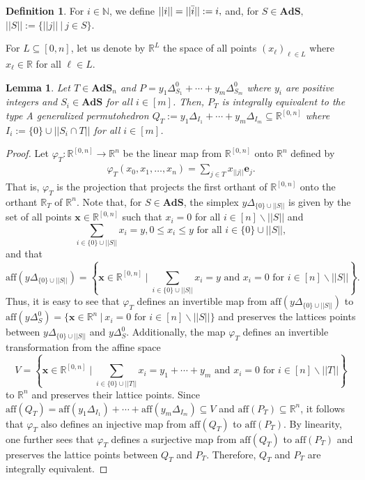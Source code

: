 \documentclass[12pt,reqno]{article}%
\newtheorem{lem}[thm]{Lemma}
\theoremstyle{definition}
\newtheorem{defn}[thm]{Definition}
\numberwithin{equation}{section}
\newcommand{\bbe}{\mathbf{e}}
\newcommand{\bbx}{\mathbf{x}}
\newcommand{\N}{\mathbb N}
\newcommand{\R}{\mathbb R}
\newcommand{\ads}{\mathbf{AdS}}
\begin{document}
\begin{defn} For $i \in \N$, we define $||i||=||\Bar{i}|| := i,$ and, for $S \in \ads,$ $||S||:= \{||j|| \ | \ j \in S\}$.
\end{defn}

For $L \subseteq [0,n]$, let us denote by $\R^{L}$ the space of all points $(x_\ell)_{\ell \in L}$ where $x_\ell \in \R$ for all $\ell \in L.$

\begin{lem}\label{lem: biject-to-type-A}
    Let $T \in \ads_n$ and $P = y_1\Delta^0_{S_1} + \cdots + y_m\Delta^0_{S_m}$ where $y_i$ are positive integers and $S_i \in \ads$ for all $i \in [m]$. Then, $P_T$ is integrally equivalent to the type A generalized permutohedron
    $Q_T := y_1\Delta_{I_1} + \cdots + y_m\Delta_{I_m} \subseteq \R^{[0,n]}$ where $I_i := \{0\}\cup ||S_i\cap T||$ for all $i \in [m]$.
\end{lem}

\begin{proof}
Let $\varphi_T: \R^{[0,n]}\longrightarrow \R^n$ be the linear map from $\R^{[0,n]}$ onto $\R^n$ defined by 
    \begin{align}
        \label{eq: projection} \varphi_T(x_0, x_1, \dots, x_n) = \sum_{j \in T}x_{||j||} \bbe_j.
    \end{align}
That is, $\varphi_T$ is the projection that projects the first orthant of $\R^{[0,n]}$ onto the orthant $\R_T$ of $\R^n$. Note that, for $S \in \ads$, the simplex $y\Delta_{\{0\}\cup||S||}$ is given by the set of all points $\bbx \in \R^{[0,n]}$ such that $x_i = 0$ for all $i \in [n]\backslash ||S||$ and
\[\sum_{i \in \{0\}\cup ||S||}x_i = y, 0 \leq x_i \leq y \text{ for all } i \in \{0\}\cup ||S||,\] 
and that
\[\mathrm{aff}\left(y\Delta_{\{0\}\cup||S||}\right)= \left\{\bbx \in \R^{[0,n]}\mid \sum_{i \in \{0\}\cup ||S||}x_i = y \text{ and } x_i = 0 \text{ for } i \in [n]\backslash ||S||\right\}.\] 
Thus, it is easy to see that $\varphi_T$ defines an invertible map from $\mathrm{aff}(y\Delta_{\{0\}\cup||S||})$ to $\mathrm{aff}(y\Delta^0_{S}) = \{\bbx \in \R^n \ | \ x_i = 0 \text{ for } i \in [n]\backslash ||S||\}$ and preserves the lattices points between $y\Delta_{\{0\}\cup||S||}$ and $y\Delta^0_{S}$. Additionally, the map $\varphi_T$ defines an invertible transformation from the affine space
\[V= \left\{\bbx \in \R^{[0,n]}\mid \sum_{i \in \{0\}\cup ||T||}x_i = y_1 + \cdots + y_m \text{ and } x_i = 0 \text{ for } i \in [n]\backslash ||T||\right\}\] 
to $\R^n$ and preserves their lattice points. Since $\mathrm{aff}(Q_T) = \mathrm{aff}(y_1\Delta_{I_1})+\cdots + \mathrm{aff}(y_m\Delta_{I_m}) \subseteq V$ and $\mathrm{aff}(P_T) \subseteq \R^n$, it follows that $\varphi_T$ also defines an injective map from $\mathrm{aff}(Q_T)$ to $\mathrm{aff}(P_T)$. By linearity, one further sees that $\varphi_T$ defines a surjective map from $\mathrm{aff}(Q_T)$ to $\mathrm{aff}(P_T)$ and preserves the lattice points between $Q_T$ and $P_T$. Therefore, $Q_T$ and $P_T$ are integrally equivalent.
\end{proof}
\end{document}
